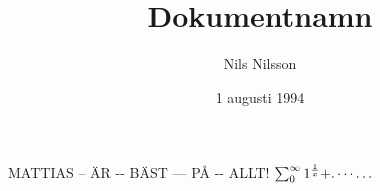 \documentclass[a4paper]{article}
\title{Dokumentnamn}
\author{Nils Nilsson}
\date{1 augusti 1994}         %
\begin{document}

\maketitle                    %


MATTIAS -- ÄR  -{}- BÄST --- PÅ -\-- ALLT! \(\sum_{0}^{\infty}1^{\frac{1}{x}} + \ldotp\cdots\ldots\)
\end{document}

